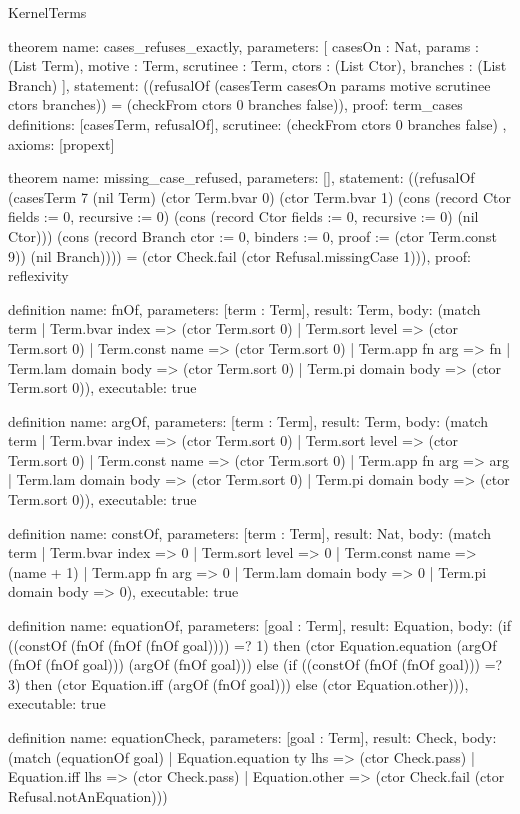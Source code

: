 \begin{lexlean}{KernelTerms}
\begin{semanticmodule}
theorem{
  name: cases_refuses_exactly,
  parameters: [
    casesOn : Nat,
    params : (List Term),
    motive : Term,
    scrutinee : Term,
    ctors : (List Ctor),
    branches : (List Branch)
  ],
  statement: ((refusalOf (casesTerm casesOn params motive scrutinee ctors branches)) = (checkFrom ctors 0 branches false)),
  proof: term_cases{
    definitions: [casesTerm, refusalOf],
    scrutinee: (checkFrom ctors 0 branches false)
  },
  axioms: [propext]
}

theorem{
  name: missing_case_refused,
  parameters: [],
  statement: ((refusalOf (casesTerm 7 (nil Term) (ctor Term.bvar 0) (ctor Term.bvar 1) (cons (record Ctor {fields := 0, recursive := 0}) (cons (record Ctor {fields := 0, recursive := 0}) (nil Ctor))) (cons (record Branch {ctor := 0, binders := 0, proof := (ctor Term.const 9)}) (nil Branch)))) = (ctor Check.fail (ctor Refusal.missingCase 1))),
  proof: reflexivity{}
}

definition{
  name: fnOf,
  parameters: [term : Term],
  result: Term,
  body: (match term
    | Term.bvar index => (ctor Term.sort 0)
    | Term.sort level => (ctor Term.sort 0)
    | Term.const name => (ctor Term.sort 0)
    | Term.app fn arg => fn
    | Term.lam domain body => (ctor Term.sort 0)
    | Term.pi domain body => (ctor Term.sort 0)),
  executable: true
}

definition{
  name: argOf,
  parameters: [term : Term],
  result: Term,
  body: (match term
    | Term.bvar index => (ctor Term.sort 0)
    | Term.sort level => (ctor Term.sort 0)
    | Term.const name => (ctor Term.sort 0)
    | Term.app fn arg => arg
    | Term.lam domain body => (ctor Term.sort 0)
    | Term.pi domain body => (ctor Term.sort 0)),
  executable: true
}

definition{
  name: constOf,
  parameters: [term : Term],
  result: Nat,
  body: (match term
    | Term.bvar index => 0
    | Term.sort level => 0
    | Term.const name => (name + 1)
    | Term.app fn arg => 0
    | Term.lam domain body => 0
    | Term.pi domain body => 0),
  executable: true
}

definition{
  name: equationOf,
  parameters: [goal : Term],
  result: Equation,
  body: (if ((constOf (fnOf (fnOf (fnOf goal)))) =? 1) then (ctor Equation.equation (argOf (fnOf (fnOf goal))) (argOf (fnOf goal))) else (if ((constOf (fnOf (fnOf goal))) =? 3) then (ctor Equation.iff (argOf (fnOf goal))) else (ctor Equation.other))),
  executable: true
}

definition{
  name: equationCheck,
  parameters: [goal : Term],
  result: Check,
  body: (match (equationOf goal)
    | Equation.equation ty lhs => (ctor Check.pass)
    | Equation.iff lhs => (ctor Check.pass)
    | Equation.other => (ctor Check.fail (ctor Refusal.notAnEquation)))
}


\end{semanticmodule}
\end{lexlean}
